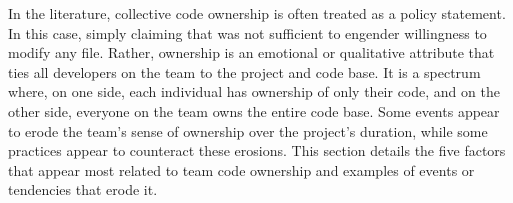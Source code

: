In the literature, collective code ownership is often treated as a policy statement. In this case, simply claiming that  was not sufficient to engender willingness to modify any file. Rather, ownership is an emotional or qualitative attribute that ties all developers on the team to the project and code base. It is a spectrum where, on one side, each individual has ownership of only their code, and on the other side, everyone on the team owns the entire code base. Some events appear to erode the team's sense of ownership over the project's duration, while some practices appear to counteract these erosions. This section details the five factors that appear most related to team code ownership and examples of events or tendencies that erode it. 




